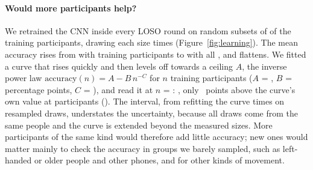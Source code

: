 \paragraph{Would more participants help?} We retrained the CNN inside every LOSO round on random subsets of
 of the training participants, drawing each size  times
(Figure~\ref{fig:learning}). The mean accuracy rises from  with 
training participants to  with all , and flattens. We fitted a
curve that rises quickly and then levels off towards a ceiling $A$, the inverse power law
$\mathrm{accuracy}(n) = A - B\,n^{-C}$ for $n$ training participants ($A$ = ,
$B$ =  percentage points, $C$ = ), and read it at $n$ =
: , only ~points above the
curve's own value at  participants (). The interval, from
refitting the curve  times on resampled draws, understates the uncertainty, because all
draws come from the same  people and the curve is extended beyond the measured sizes. More
participants of the same kind would therefore add little accuracy; new ones would matter mainly to check the accuracy
in groups we barely sampled, such as left-handed or older people and other phones, and for other kinds of movement.
